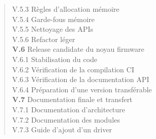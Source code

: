 \begin{quote}
\hspace{2.5em} V.5.3 \hspace{0.5em} Règles d'allocation mémoire \dotfill \pageref{subsec:alloc}\\
\hspace{2.5em} V.5.4 \hspace{0.5em} Garde-fous mémoire \dotfill \pageref{subsec:guards}\\
\hspace{2.5em} V.5.5 \hspace{0.5em} Nettoyage des APIs \dotfill \pageref{subsec:apiclean}\\
\hspace{2.5em} V.5.6 \hspace{0.5em} Refactor léger \dotfill \pageref{subsec:refactor}\\
\textbf{V.6} \hspace{1em} Release candidate du noyau firmware \dotfill \pageref{sec:release}\\
\hspace{2.5em} V.6.1 \hspace{0.5em} Stabilisation du code \dotfill \pageref{subsec:stab}\\
\hspace{2.5em} V.6.2 \hspace{0.5em} Vérification de la compilation CI \dotfill \pageref{subsec:ci_verif}\\
\hspace{2.5em} V.6.3 \hspace{0.5em} Vérification de la documentation API \dotfill \pageref{subsec:doc_verif}\\
\hspace{2.5em} V.6.4 \hspace{0.5em} Préparation d'une version transférable \dotfill \pageref{subsec:transfer_ver}\\
\textbf{V.7} \hspace{1em} Documentation finale et transfert \dotfill \pageref{sec:docs}\\
\hspace{2.5em} V.7.1 \hspace{0.5em} Documentation d'architecture \dotfill \pageref{subsec:doc_archi}\\
\hspace{2.5em} V.7.2 \hspace{0.5em} Documentation des modules \dotfill \pageref{subsec:doc_mods}\\
\hspace{2.5em} V.7.3 \hspace{0.5em} Guide d'ajout d'un driver \dotfill \pageref{subsec:doc_driver}\\

\end{quote}

